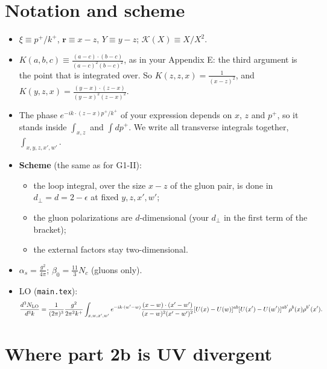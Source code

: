 \documentclass[10pt]{article}
\numberwithin{equation}{section}
\newcommand{\KK}{\mathcal K}
\begin{document}
\section{Notation and scheme}\label{sec:conv}
\begin{itemize}
\item $\xi\equiv p^+/k^+$, $\mathbf r\equiv x-z$, $Y\equiv y-z$; $\KK(X)\equiv X/X^2$.
\item $K(a,b,c)\equiv\frac{(a-c)\cdot(b-c)}{(a-c)^2(b-c)^2}$, as in your Appendix E: the third argument is the point that is integrated over. So $K(z,z,x)=\frac{1}{(x-z)^2}$, and $K(y,z,x)=\frac{(y-x)\cdot(z-x)}{(y-x)^2(z-x)^2}$.
\item The phase $e^{-ik\cdot(z-x)p^+/k^+}$ of your expression depends on $x$, $z$ and $p^+$, so it stands inside $\int_{x,z}$ and $\int dp^+$. We write all transverse integrals together, $\int_{x,y,z,x',w'}$.
\item \textbf{Scheme} (the same as for G1-II):
\begin{itemize}
\item the loop integral, over the size $x-z$ of the gluon pair, is done in $d_\perp=d=2-\epsilon$ at fixed $y,z,x',w'$;
\item the gluon polarizations are $d$-dimensional (your $d_\perp$ in the first term of the bracket);
\item the external factors stay two-dimensional.
\end{itemize}
\item $\alpha_s=\frac{g^2}{4\pi}$; $\beta_0=\frac{11}{3}N_c$ (gluons only).
\item LO (\texttt{main.tex}):
\begin{equation*}
\frac{d^3N_{\rm LO}}{d^3k}=\frac{1}{(2\pi)^3}\frac{g^2}{2\pi^2k^+}\int_{x,w,x',w'}e^{-ik\cdot(w'-w)}\frac{(x-w)\cdot(x'-w')}{(x-w)^2(x'-w')^2}[U(x)-U(w)]^{ab}[U(x')-U(w')]^{ab'}\rho^b(x)\rho^{b'}(x').
\end{equation*}
\end{itemize}

\section{Where part 2b is UV divergent}\label{sec:uv}
\end{document}
